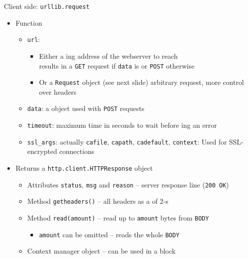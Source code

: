 \begin{frame}[fragile]{Client side: \texttt{urllib.request}}
%
\begin{itemize}
\item Function 
	\begin{itemize}
	\item \texttt{url}:
		\begin{itemize}
		\item Either a ing \Thus address of the webserver to reach \\
			results in a \texttt{GET} request if \texttt{data} is  or \texttt{POST} otherwise
		\item Or a \texttt{Request} object (see next slide) \Thus arbitrary request, more control over headers
		\end{itemize}
	\item \texttt{data}: a  object used with \texttt{POST} requests
	\item \texttt{timeout}: maximum time in seconds to wait before ing an error
	\item \texttt{ssl\_args}: actually \texttt{cafile}, \texttt{capath}, \texttt{cadefault}, \texttt{context}: Used for SSL-encrypted connections
	\end{itemize}
\pause
\item Returns a \texttt{http.client.HTTPResponse} object
	\begin{itemize}
	\item Attributes \texttt{status}, \texttt{msg} and \texttt{reason} -- server response line (\zB \texttt{200 OK})
	\item Method \texttt{getheaders()} -- all headers as a  of 2-s
	\item Method \texttt{read(amount)} -- read up to \texttt{amount} bytes from \texttt{BODY}
		\begin{itemize}
		\item \texttt{amount} can be omitted -- reads the whole \texttt{BODY}
		\end{itemize}
	\item Context manager object -- can be used in a  block
	\end{itemize}
\end{itemize}
%
\end{frame}


